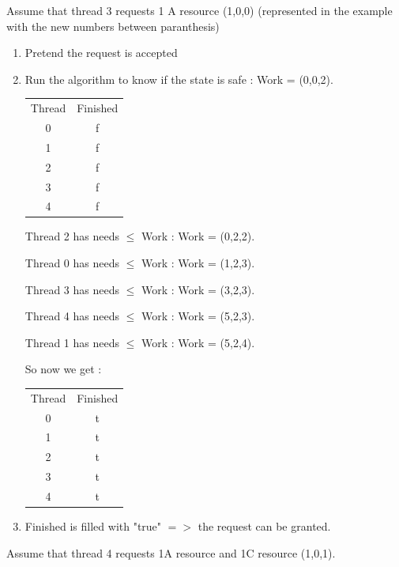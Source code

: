 \documentclass[a4paper,10pt]{article}
\begin{document}
Assume that thread 3 requests 1 A resource (1,0,0) (represented in the example with the new numbers between paranthesis)
\begin{enumerate}
  \item Pretend the request is accepted
  \item Run the algorithm to know if the state is safe : Work = (0,0,2). 

  \begin{center}
    \begin{tabular}{cc}
      Thread & Finished\\
      0 & f\\
      1 & f\\
      2 & f\\
      3 & f\\
      4 & f\\
    \end{tabular}
  \end{center}

Thread 2 has needs $\leq$ Work  : Work = (0,2,2).

Thread 0 has needs $\leq$ Work : Work = (1,2,3).

Thread 3 has needs $\leq$ Work : Work = (3,2,3).

Thread 4 has needs $\leq$ Work : Work = (5,2,3).

Thread 1 has needs $\leq$ Work : Work = (5,2,4).

So now we get :

\begin{center}
    \begin{tabular}{cc}
      Thread & Finished\\
      0 & t\\
      1 & t\\
      2 & t\\
      3 & t\\
      4 & t\\
    \end{tabular}
  \end{center}

\item Finished is filled with "true" $=>$ the request can be granted.
\end{enumerate}

Assume that thread 4 requests 1A resource and 1C resource (1,0,1).
\end{document}
